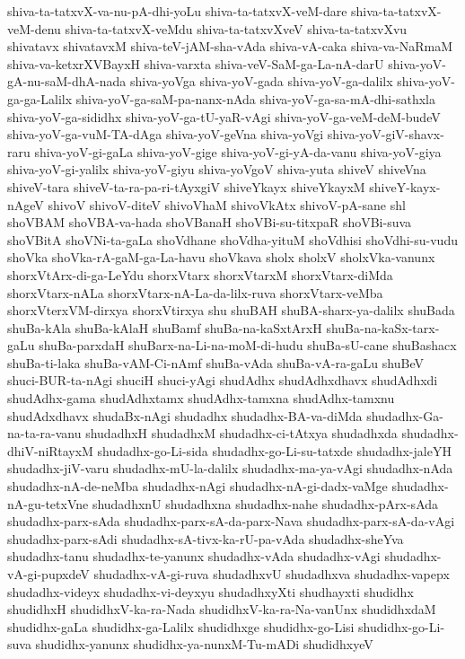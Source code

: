 {shiva-ta-tatxvX-va-nu-pA-dhi-yoLu
shiva-ta-tatxvX-veM-dare
shiva-ta-tatxvX-veM-denu
shiva-ta-tatxvX-veMdu
shiva-ta-tatxvXveV
shiva-ta-tatxvXvu
shivatavx
shivatavxM
shiva-teV-jAM-sha-vAda
shiva-vA-caka
shiva-va-NaRmaM
shiva-va-ketxrXVBayxH
shiva-varxta
shiva-veV-SaM-ga-La-nA-darU
shiva-yoV-gA-nu-saM-dhA-nada
shiva-yoVga
shiva-yoV-gada
shiva-yoV-ga-dalilx
shiva-yoV-ga-ga-Lalilx
shiva-yoV-ga-saM-pa-nanx-nAda
shiva-yoV-ga-sa-mA-dhi-sathxla
shiva-yoV-ga-sididhx
shiva-yoV-ga-tU-yaR-vAgi
shiva-yoV-ga-veM-deM-budeV
shiva-yoV-ga-vuM-TA-dAga
shiva-yoV-geVna
shiva-yoVgi
shiva-yoV-giV-shavx-raru
shiva-yoV-gi-gaLa
shiva-yoV-gige
shiva-yoV-gi-yA-da-vanu
shiva-yoV-giya
shiva-yoV-gi-yalilx
shiva-yoV-giyu
shiva-yoVgoV
shiva-yuta
shiveV
shiveVna
shiveV-tara
shiveV-ta-ra-pa-ri-tAyxgiV
shiveYkayx
shiveYkayxM
shiveY-kayx-nAgeV
shivoV
shivoV-diteV
shivoVhaM
shivoVkAtx
shivoV-pA-sane
shl
shoVBAM
shoVBA-va-hada
shoVBanaH
shoVBi-su-titxpaR
shoVBi-suva
shoVBitA
shoVNi-ta-gaLa
shoVdhane
shoVdha-yituM
shoVdhisi
shoVdhi-su-vudu
shoVka
shoVka-rA-gaM-ga-La-havu
shoVkava
sholx
sholxV
sholxVka-vanunx
shorxVtArx-di-ga-LeYdu
shorxVtarx
shorxVtarxM
shorxVtarx-diMda
shorxVtarx-nALa
shorxVtarx-nA-La-da-lilx-ruva
shorxVtarx-veMba
shorxVterxVM-dirxya
shorxVtirxya
shu
shuBAH
shuBA-sharx-ya-dalilx
shuBada
shuBa-kAla
shuBa-kAlaH
shuBamf
shuBa-na-kaSxtArxH
shuBa-na-kaSx-tarx-gaLu
shuBa-parxdaH
shuBarx-na-Li-na-moM-di-hudu
shuBa-sU-cane
shuBashacx
shuBa-ti-laka
shuBa-vAM-Ci-nAmf
shuBa-vAda
shuBa-vA-ra-gaLu
shuBeV
shuci-BUR-ta-nAgi
shuciH
shuci-yAgi
shudAdhx
shudAdhxdhavx
shudAdhxdi
shudAdhx-gama
shudAdhxtamx
shudAdhx-tamxna
shudAdhx-tamxnu
shudAdxdhavx
shudaBx-nAgi
shudadhx
shudadhx-BA-va-diMda
shudadhx-Ga-na-ta-ra-vanu
shudadhxH
shudadhxM
shudadhx-ci-tAtxya
shudadhxda
shudadhx-dhiV-niRtayxM
shudadhx-go-Li-sida
shudadhx-go-Li-su-tatxde
shudadhx-jaleYH
shudadhx-jiV-varu
shudadhx-mU-la-dalilx
shudadhx-ma-ya-vAgi
shudadhx-nAda
shudadhx-nA-de-neMba
shudadhx-nAgi
shudadhx-nA-gi-dadx-vaMge
shudadhx-nA-gu-tetxVne
shudadhxnU
shudadhxna
shudadhx-nahe
shudadhx-pArx-sAda
shudadhx-parx-sAda
shudadhx-parx-sA-da-parx-Nava
shudadhx-parx-sA-da-vAgi
shudadhx-parx-sAdi
shudadhx-sA-tivx-ka-rU-pa-vAda
shudadhx-sheYva
shudadhx-tanu
shudadhx-te-yanunx
shudadhx-vAda
shudadhx-vAgi
shudadhx-vA-gi-pupxdeV
shudadhx-vA-gi-ruva
shudadhxvU
shudadhxva
shudadhx-vapepx
shudadhx-videyx
shudadhx-vi-deyxyu
shudadhxyXti
shudhayxti
shudidhx
shudidhxH
shudidhxV-ka-ra-Nada
shudidhxV-ka-ra-Na-vanUnx
shudidhxdaM
shudidhx-gaLa
shudidhx-ga-Lalilx
shudidhxge
shudidhx-go-Lisi
shudidhx-go-Li-suva
shudidhx-yanunx
shudidhx-ya-nunxM-Tu-mADi
shudidhxyeV
}
